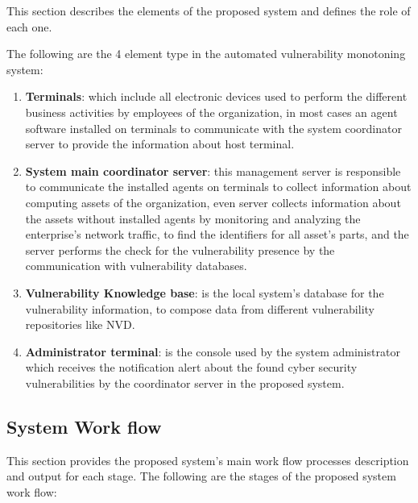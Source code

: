 \documentclass{llncs}
\begin{document}
\par This section describes the elements of the proposed system and defines the role of each one. 

The following are the 4 element type in the automated vulnerability monotoning system:

\renewcommand{\labelenumi}{\Roman{enumi}}
 \begin{enumerate}
 \item \textbf{Terminals}: which include all electronic devices used to perform the different business activities by employees of the organization, in most cases an agent software installed on terminals to communicate with the system coordinator server to provide the information about host terminal.
 
 \item \textbf{System main coordinator server}: this management server is responsible to communicate the installed agents on terminals to collect information about computing assets of the organization, even server collects information about the assets without installed agents by monitoring and analyzing the enterprise's network traffic, to find the identifiers for all asset's parts, and the server performs the check for the vulnerability presence by the communication with vulnerability databases.
 
 \item \textbf{Vulnerability Knowledge base}: is the local system's database for the vulnerability information, to compose data from different vulnerability repositories like NVD.
 
 
  \item \textbf{Administrator terminal}: is the console used by the system administrator which receives the notification alert about the found cyber security vulnerabilities by the coordinator server in the proposed system.     
 \end{enumerate}
 
\subsection{System Work flow}

\par This section provides the proposed system's main work flow processes description and output for each stage. 
The following are the stages of the proposed system work flow:
 
\end{document}

